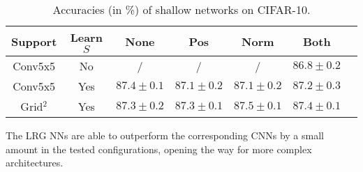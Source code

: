 \begin{table}[H]
  \caption{Accuracies (in \%) of shallow networks on CIFAR-10.}
  \begin{center}
    \bgroup
    \def\arraystretch{1.5}%
    \begin{tabular}{|c|c|c|c|c|c|c|}
      \hline
      Support & Learn $S$ & None & Pos & Norm & Both\\
      \hline
      \hline
      Conv5x5 & No & / & / & / & $86.8 \pm 0.2$\\
      \hline
      Conv5x5 & Yes & $87.4 \pm 0.1$ & $87.1 \pm 0.2$ & $87.1 \pm 0.2$ & $87.2 \pm 0.3$\\
      \hline
      Grid$^2$ & Yes & $87.3 \pm 0.2$ & $87.3 \pm 0.1$ & $87.5 \pm 0.1$ & $87.4 \pm 0.1$\\
      \hline
    \end{tabular}
    \egroup
  \end{center}
  \label{cifar}
\end{table}

The LRG NNs are able to outperform the corresponding CNNs by a small amount in the tested configurations, opening the way for more complex architectures.



